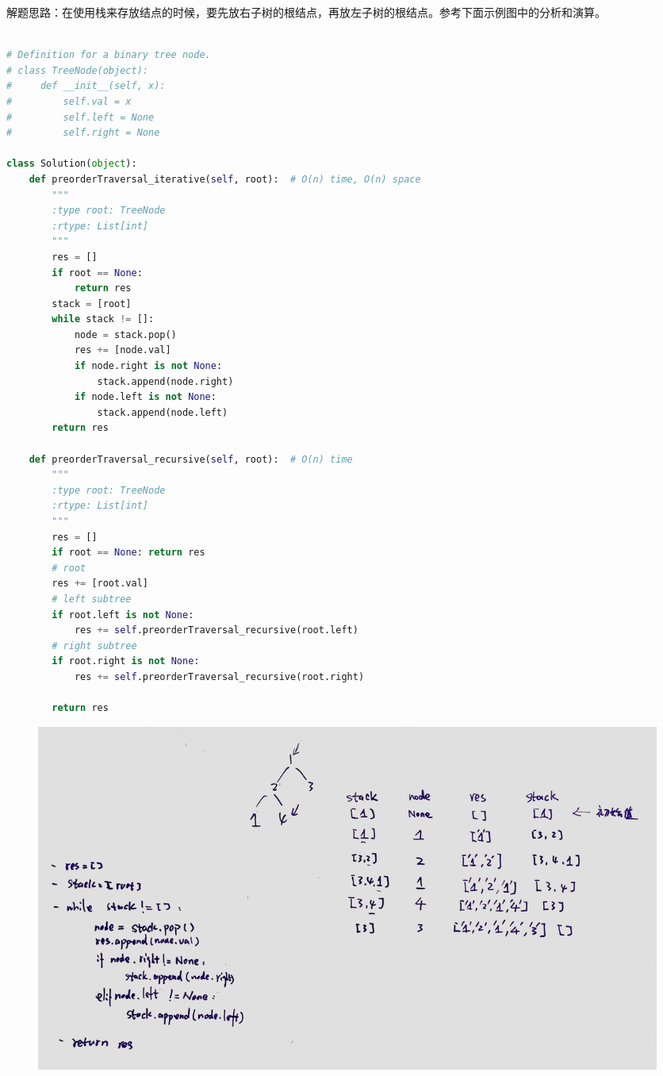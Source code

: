 \documentclass[a4paper,10pt]{article}
\begin{document}
\begin{CJK*}{UTF8}{gbsn}
\noindent 解题思路：在使用栈来存放结点的时候，要先放右子树的根结点，再放左子树的根结点。参考下面示例图中的分析和演算。\\
\end{CJK*}

\begin{lstlisting}[language=Python, caption=Problem144. Binary Tree Preorder Traversal]

# Definition for a binary tree node.
# class TreeNode(object):
#     def __init__(self, x):
#         self.val = x
#         self.left = None
#         self.right = None

class Solution(object):
    def preorderTraversal_iterative(self, root):  # O(n) time, O(n) space
        """
        :type root: TreeNode
        :rtype: List[int]
        """
        res = []
        if root == None:
            return res
        stack = [root]
        while stack != []:
            node = stack.pop()
            res += [node.val]
            if node.right is not None:
                stack.append(node.right)
            if node.left is not None:
                stack.append(node.left)
        return res

    def preorderTraversal_recursive(self, root):  # O(n) time
        """
        :type root: TreeNode
        :rtype: List[int]
        """
        res = []
        if root == None: return res
        # root
        res += [root.val]
        # left subtree
        if root.left is not None:
            res += self.preorderTraversal_recursive(root.left)
        # right subtree
        if root.right is not None:
            res += self.preorderTraversal_recursive(root.right)

        return res
\end{lstlisting}

\begin{figure}[h]
    \includegraphics[width=\textwidth]{leetcode144.jpg}
    \centering \\
\end{figure}
\end{document}
